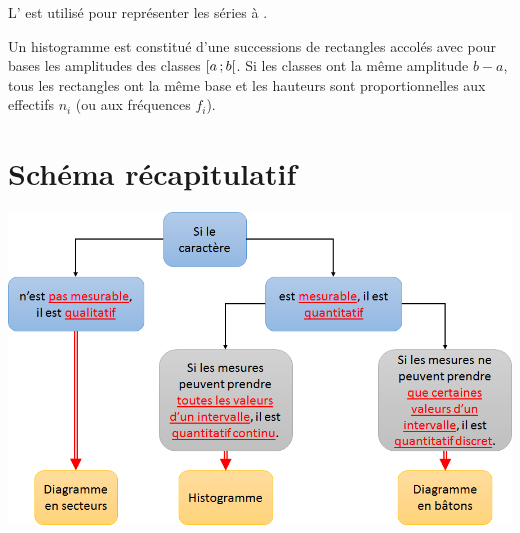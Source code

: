 \documentclass[12pt,a4paper]{article}
\begin{document}
\begin{mybox}
	L' est utilisé pour représenter les séries à .
	
	Un histogramme est constitué d'une successions de rectangles accolés avec pour bases les amplitudes des classes $\mbox{\ensuremath{\left[a\mathpunct{};b\right[}}$.
	Si les classes ont la même amplitude $b - a$, tous les rectangles ont la même base et les hauteurs sont proportionnelles aux effectifs $n_i$ (ou aux fréquences $f_i$).
\end{mybox}	



\section{Schéma récapitulatif}

\vspace*{1cm}

\begin{center}
	\includegraphics[scale=0.9]{img/bilan}
\end{center}
\end{document}
